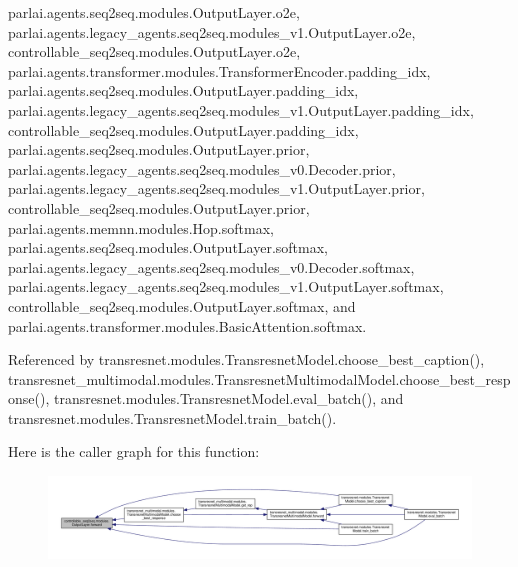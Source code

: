 parlai.\+agents.\+seq2seq.\+modules.\+Output\+Layer.\+o2e, parlai.\+agents.\+legacy\+\_\+agents.\+seq2seq.\+modules\+\_\+v1.\+Output\+Layer.\+o2e, controllable\+\_\+seq2seq.\+modules.\+Output\+Layer.\+o2e, parlai.\+agents.\+transformer.\+modules.\+Transformer\+Encoder.\+padding\+\_\+idx, parlai.\+agents.\+seq2seq.\+modules.\+Output\+Layer.\+padding\+\_\+idx, parlai.\+agents.\+legacy\+\_\+agents.\+seq2seq.\+modules\+\_\+v1.\+Output\+Layer.\+padding\+\_\+idx, controllable\+\_\+seq2seq.\+modules.\+Output\+Layer.\+padding\+\_\+idx, parlai.\+agents.\+seq2seq.\+modules.\+Output\+Layer.\+prior, parlai.\+agents.\+legacy\+\_\+agents.\+seq2seq.\+modules\+\_\+v0.\+Decoder.\+prior, parlai.\+agents.\+legacy\+\_\+agents.\+seq2seq.\+modules\+\_\+v1.\+Output\+Layer.\+prior, controllable\+\_\+seq2seq.\+modules.\+Output\+Layer.\+prior, parlai.\+agents.\+memnn.\+modules.\+Hop.\+softmax, parlai.\+agents.\+seq2seq.\+modules.\+Output\+Layer.\+softmax, parlai.\+agents.\+legacy\+\_\+agents.\+seq2seq.\+modules\+\_\+v0.\+Decoder.\+softmax, parlai.\+agents.\+legacy\+\_\+agents.\+seq2seq.\+modules\+\_\+v1.\+Output\+Layer.\+softmax, controllable\+\_\+seq2seq.\+modules.\+Output\+Layer.\+softmax, and parlai.\+agents.\+transformer.\+modules.\+Basic\+Attention.\+softmax.



Referenced by transresnet.\+modules.\+Transresnet\+Model.\+choose\+\_\+best\+\_\+caption(), transresnet\+\_\+multimodal.\+modules.\+Transresnet\+Multimodal\+Model.\+choose\+\_\+best\+\_\+response(), transresnet.\+modules.\+Transresnet\+Model.\+eval\+\_\+batch(), and transresnet.\+modules.\+Transresnet\+Model.\+train\+\_\+batch().

Here is the caller graph for this function\+:
\nopagebreak
\begin{figure}[H]
\begin{center}
\leavevmode
\includegraphics[width=350pt]{classcontrollable__seq2seq_1_1modules_1_1OutputLayer_aedb4579621c30dfed917004e89aa50cd_icgraph}
\end{center}
\end{figure}
\mbox{\label{classcontrollable__seq2seq_1_1modules_1_1OutputLayer_a74905ac31b97b3943484c27caac2a467}} 

